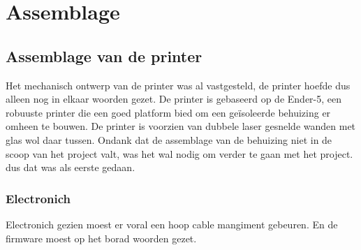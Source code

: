 \chapter{Assemblage}
\label{Assemblage}

\section{Assemblage van de printer}

Het mechanisch ontwerp van de printer was al vastgesteld, de printer hoefde dus
alleen nog in elkaar woorden gezet. De printer is gebaseerd op de Ender-5, een
robuuste printer die een goed platform bied om een geïsoleerde behuizing  er
omheen te bouwen. De printer is voorzien van dubbele laser gesnelde wanden met
glas wol daar tussen. Ondank dat de assemblage van de behuizing niet in de
scoop van het project valt, was het wal nodig om verder te gaan met het
project. dus dat was als eerste gedaan.

\subsection{Electronich}

Electronich gezien moest er voral een hoop cable mangiment gebeuren. En de
firmware moest op het borad woorden gezet.


